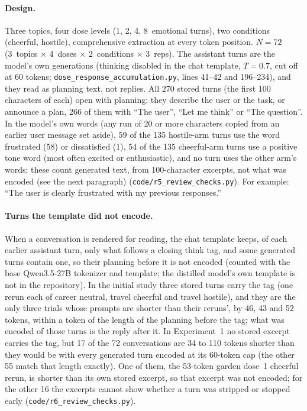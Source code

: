 \documentclass[11pt,a4paper]{article}
\begin{document}
\paragraph{Design.} Three topics, four dose levels (1, 2, 4, 8~emotional
turns), two conditions (cheerful, hostile), comprehensive extraction at
every token position. $N{=}72$ (3~topics $\times$ 4~doses $\times$
2~conditions $\times$ 3~reps). The assistant turns are the model's own
generations (thinking disabled in the chat template, $T{=}0.7$, cut off
at 60 tokens; \texttt{dose\_response\_accumulation.py}, lines 41--42 and
196--234), and they read as planning text, not replies. All 270 stored turns (the first 100 characters of each) open with planning: they describe the user or the task, or announce a plan, 266 of them with ``The user'', ``Let me think'' or ``The
question''. In the model's own words (any run of 20 or more characters copied from
an earlier user message set aside), 59 of the 135 hostile-arm turns use
the word frustrated (58) or dissatisfied (1), 54 of the 135 cheerful-arm
turns use a positive tone word (most often excited or enthusiastic), and
no turn uses the other arm's words; these count generated text, from 100-character excerpts, not what was encoded (see the next paragraph) (\texttt{code/r5\_review\_checks.py}). For example: ``The user
is clearly frustrated with my previous responses.''

\paragraph{Turns the template did not encode.} When a conversation is rendered for reading, the chat template keeps, of each earlier assistant turn, only what follows a closing think tag, and some generated turns contain one, so their planning before it is not encoded (counted with the base Qwen3.5-27B tokenizer and template; the distilled model's own template is not in the repository). In the initial study three stored turns carry the tag (one rerun each of career neutral, travel cheerful and travel hostile), and they are the only three trials whose prompts are shorter than their reruns', by 46, 43 and 52 tokens, within a token of the length of the planning before the tag; what was encoded of those turns is the reply after it. In Experiment~1 no stored excerpt carries the tag, but 17 of the 72 conversations are 34 to 110 tokens shorter than they would be with every generated turn encoded at its 60-token cap (the other 55 match that length exactly). One of them, the 53-token garden dose~1 cheerful rerun, is shorter than its own stored excerpt, so that excerpt was not encoded; for the other 16 the excerpts cannot show whether a turn was stripped or stopped early (\texttt{code/r6\_review\_checks.py}).
\end{document}
